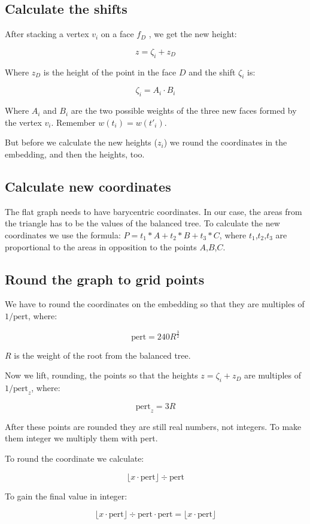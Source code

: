 \subsection*{Calculate the shifts} 

After stacking a vertex $v_i$ on a face $f_D$ , we get the new height:

$$z= \zeta_i + z_D $$

Where $z_D$ is the height of the point in the face $D$ and the shift $\zeta_i$ is:

$$\zeta_i = A_i\cdot B_i$$

Where  $ A_i$ and $B_i$ are the two possible weights of the three new faces formed by the vertex $v_i$. Remember $w(t_i)= w(t'_i) $.

But before we calculate the new heights ($z_i$) we round the coordinates in the embedding, and then the heights, too.

\subsection*{Calculate new coordinates}

The flat graph needs to have barycentric coordinates. In our case, the areas from the triangle has to be the values of the balanced tree. To calculate the new coordinates we use the formula: $P = t_1*A + t_2*B + t_3*C$, where $t_1$,$t_2$,$t_3$ are proportional to the areas in opposition to the points $A$,$B$,$C$.

\subsection*{Round the graph to grid points}

We have to round the coordinates on the embedding so that they are multiples of $1/\text{pert}$, where:

$$\text{pert}=240R^{\frac{3}{2}}$$

$R$ is the weight of the root from the balanced tree.

Now we lift, rounding, the points so that the heights $z= \zeta_i + z_D $ are multiples of $1/\text{pert}_z$, where: 

$$\text{pert}_z=3R$$ 

After these points are rounded they are still real numbers, not integers. To make them integer we multiply them with pert.

To round the coordinate we calculate:

$$\lfloor x\cdot\text{pert}\rfloor \div \text{pert}$$

To gain the final value in integer:

$$\lfloor x\cdot\text{pert}\rfloor \div \text{pert} \cdot\text{pert} = \lfloor x\cdot\text{pert}\rfloor$$
